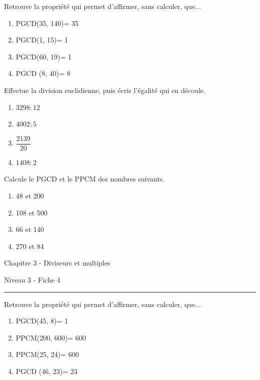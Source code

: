 \documentclass[12pt,parskip=half-, twoside=semi]{scrartcl}
\begin{document}
\setcounter{exercise}{0}
      
\begin{exercise}
  Retrouve la propriété qui permet d'affirmer, sans calculer, que... 
  \begin{enumerate}[cols=2]
    \item PGCD(35, 140)= 35
    \item PGCD(1, 15)= 1
    \item PGCD(60, 19)= 1
    \item PGCD (8, 40)= 8
  \end{enumerate}
\end{exercise}

\begin{exercise}
  Effectue la division euclidienne, puis écris l'égalité qui en découle. 
    \begin{enumerate}[cols=2]
      \item \(3298 : 12\)
      \item \(4002 : 5\)
      \item \(\dfrac{2139}{20}\)
      \item \(1408:2\)
    \end{enumerate}
\end{exercise}

\begin{exercise}
  Calcule le PGCD et le PPCM des nombres suivants. 
    \begin{enumerate}[cols=2]
      \item 48 et 200
      \item 108 et 500
      \item 66 et 140
      \item 270 et 84
    \end{enumerate}
\end{exercise}

\newpage

\begin{center}
  \bfseries
  \begin{Huge}
    Chapitre 3 - Diviseurs et multiples
  \end{Huge}
  \smallbreak
  \begin{large}
    Niveau 3    - Fiche 4
  \end{large}
  \smallbreak
  \rule[10pt]{.5\linewidth}{1 pt}
\end{center}

\setcounter{exercise}{0}
      
\begin{exercise}
  Retrouve la propriété qui permet d'affirmer, sans calculer, que... 
  \begin{enumerate}[cols=2]
    \item PGCD(45, 8)= 1
    \item PPCM(200, 600)= 600
    \item PPCM(25, 24)= 600
    \item PGCD (46, 23)= 23
  \end{enumerate}
\end{exercise}
\end{document}
